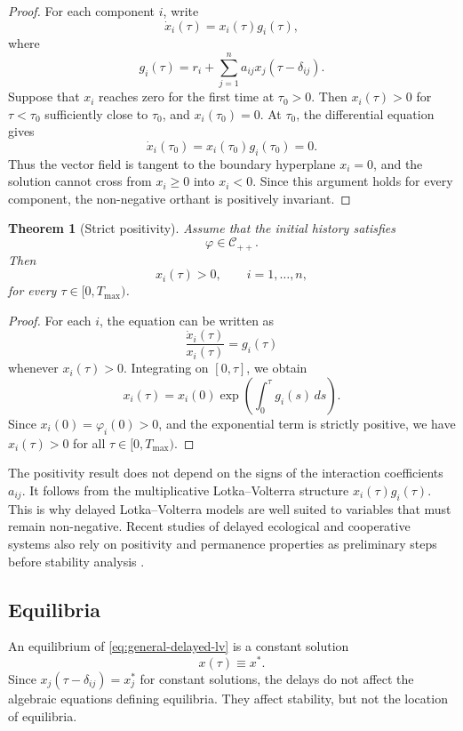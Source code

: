 \documentclass[11pt]{article}
\newtheorem{theorem}{Theorem}
\begin{document}
\begin{proof}
	For each component \(i\), write
	\[
	\dot{x}_i(\tau)=x_i(\tau)g_i(\tau),
	\]
	where
	\[
	g_i(\tau)
	=
	r_i+\sum_{j=1}^{n}a_{ij}x_j(\tau-\delta_{ij}).
	\]
	Suppose that \(x_i\) reaches zero for the first time at \(\tau_0>0\). Then
	\(x_i(\tau)>0\) for \(\tau<\tau_0\) sufficiently close to \(\tau_0\), and
	\(x_i(\tau_0)=0\). At \(\tau_0\), the differential equation gives
	\[
	\dot{x}_i(\tau_0)=x_i(\tau_0)g_i(\tau_0)=0.
	\]
	Thus the vector field is tangent to the boundary hyperplane \(x_i=0\), and the
	solution cannot cross from \(x_i\geq 0\) into \(x_i<0\). Since this argument holds
	for every component, the non-negative orthant is positively invariant.
\end{proof}

\begin{theorem}[Strict positivity]
	\label{thm:strict-positivity}
	Assume that the initial history satisfies
	\[
	\varphi\in\mathcal{C}_{++}.
	\]
	Then
	\[
	x_i(\tau)>0,
	\qquad i=1,\ldots,n,
	\]
	for every \(\tau\in[0,T_{\max})\).
\end{theorem}

\begin{proof}
	For each \(i\), the equation can be written as
	\[
	\frac{\dot{x}_i(\tau)}{x_i(\tau)}=g_i(\tau)
	\]
	whenever \(x_i(\tau)>0\). Integrating on \([0,\tau]\), we obtain
	\[
	x_i(\tau)
	=
	x_i(0)
	\exp\left(
	\int_{0}^{\tau}
	g_i(s)\,ds
	\right).
	\]
	Since \(x_i(0)=\varphi_i(0)>0\), and the exponential term is strictly positive,
	we have \(x_i(\tau)>0\) for all \(\tau\in[0,T_{\max})\).
\end{proof}

 
	The positivity result does not depend on the signs of the interaction
	coefficients \(a_{ij}\). It follows from the multiplicative Lotka--Volterra
	structure \(x_i(\tau)g_i(\tau)\). This is why delayed Lotka--Volterra models are
	well suited to variables that must remain non-negative. Recent studies of
	delayed ecological and cooperative systems also rely on positivity and
	permanence properties as preliminary steps before stability analysis
	\cite{xu2022delayedlv,JiangHalikMuhammadhaji2023NSpeciesDelays}.
 

\subsection{Equilibria}

An equilibrium of \eqref{eq:general-delayed-lv} is a constant solution
\[
x(\tau)\equiv x^\ast.
\]
Since \(x_j(\tau-\delta_{ij})=x_j^\ast\) for constant solutions, the delays do
not affect the algebraic equations defining equilibria. They affect stability,
but not the location of equilibria.
\end{document}
